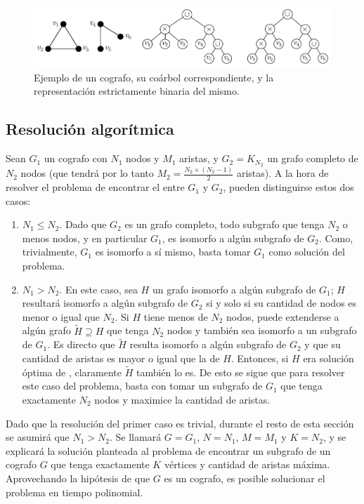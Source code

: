 \begin{figure}[htbp]
    \centering
    \includegraphics{imagenes/ex3_ejemplo-coarbol.pdf}
    \caption{Ejemplo de un cografo, su coárbol correspondiente, y la
    representación estrictamente binaria del mismo.}
    \label{fig:cografos:ejemplo-coarbol}
\end{figure}

\subsection{Resolución algorítmica}
Sean $G_1$ un cografo con $N_1$ nodos y $M_1$ aristas, y $G_2 = K_{N_2}$ un
grafo completo de $N_2$ nodos (que tendrá por lo tanto $M_2 = \frac{N_2 \times
(N_2 - 1)}{2}$ aristas). A la hora de resolver el problema de encontrar el
 entre $G_1$ y $G_2$, pueden distinguirse estos dos casos:
\begin{enumerate}
    \item $N_1 \leq N_2$. Dado que $G_2$ es un grafo completo, todo
    subgrafo que tenga $N_2$ o menos nodos, y en particular $G_1$,
    es isomorfo a algún subgrafo de $G_2$. Como, trivialmente, $G_1$ es
    isomorfo a sí mismo, basta tomar $G_1$ como solución del problema.
    \item $N_1 > N_2$. En este caso, sea $H$ un grafo isomorfo a algún
    subgrafo de $G_1$; $H$ resultará isomorfo a algún subgrafo de $G_2$ si
    y solo si su cantidad de nodos es menor o igual que $N_2$. Si $H$ tiene
    menos de $N_2$ nodos, puede extenderse a algún grafo $\tilde{H} \supseteq
    H$ que tenga $N_2$ nodos y también sea isomorfo a un subgrafo de $G_1$.
    Es directo que $\tilde{H}$ resulta isomorfo a algún subgrafo de $G_2$ y
    que su cantidad de aristas es mayor o igual que la de $H$. Entonces, si
    $H$ era solución óptima de , claramente $\tilde{H}$ también lo
    es. De esto se sigue que para resolver este caso del problema, basta con
    tomar un subgrafo de $G_1$ que tenga exactamente $N_2$ nodos y maximice la
    cantidad de aristas.
\end{enumerate}

Dado que la resolución del primer caso es trivial, durante el resto de esta
sección se asumirá que $N_1 > N_2$. Se llamará $G = G_1$, $N = N_1$, $M = M_1$
y $K = N_2$, y se explicará la solución planteada al problema de encontrar un
subgrafo de un cografo $G$ que tenga exactamente $K$ vértices y cantidad de
aristas máxima. Aprovechando la hipótesis de que $G$ es un cografo,
es posible solucionar el problema en tiempo polinomial.

